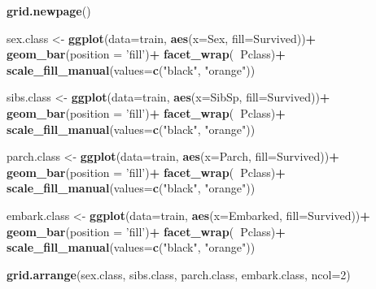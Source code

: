 \documentclass[
]{article}
\newenvironment{Shaded}{\begin{snugshade}}{\end{snugshade}}
\newcommand{\DataTypeTok}[1]{\textcolor[rgb]{0.13,0.29,0.53}{#1}}
\newcommand{\DecValTok}[1]{\textcolor[rgb]{0.00,0.00,0.81}{#1}}
\newcommand{\KeywordTok}[1]{\textcolor[rgb]{0.13,0.29,0.53}{\textbf{#1}}}
\newcommand{\NormalTok}[1]{#1}
\newcommand{\OperatorTok}[1]{\textcolor[rgb]{0.81,0.36,0.00}{\textbf{#1}}}
\newcommand{\StringTok}[1]{\textcolor[rgb]{0.31,0.60,0.02}{#1}}
\begin{document}
\begin{Shaded}
\begin{Highlighting}[]
\KeywordTok{grid.newpage}\NormalTok{()}

\NormalTok{sex.class <-}\StringTok{ }\KeywordTok{ggplot}\NormalTok{(}\DataTypeTok{data=}\NormalTok{train, }\KeywordTok{aes}\NormalTok{(}\DataTypeTok{x=}\NormalTok{Sex, }\DataTypeTok{fill=}\NormalTok{Survived))}\OperatorTok{+}
\StringTok{  }\KeywordTok{geom_bar}\NormalTok{(}\DataTypeTok{position =} \StringTok{'fill'}\NormalTok{)}\OperatorTok{+}
\StringTok{  }\KeywordTok{facet_wrap}\NormalTok{(}\OperatorTok{~}\NormalTok{Pclass)}\OperatorTok{+}
\StringTok{  }\KeywordTok{scale_fill_manual}\NormalTok{(}\DataTypeTok{values=}\KeywordTok{c}\NormalTok{(}\StringTok{"black"}\NormalTok{, }\StringTok{"orange"}\NormalTok{))}

\NormalTok{sibs.class <-}\StringTok{ }\KeywordTok{ggplot}\NormalTok{(}\DataTypeTok{data=}\NormalTok{train, }\KeywordTok{aes}\NormalTok{(}\DataTypeTok{x=}\NormalTok{SibSp, }\DataTypeTok{fill=}\NormalTok{Survived))}\OperatorTok{+}
\StringTok{  }\KeywordTok{geom_bar}\NormalTok{(}\DataTypeTok{position =} \StringTok{'fill'}\NormalTok{)}\OperatorTok{+}
\StringTok{  }\KeywordTok{facet_wrap}\NormalTok{(}\OperatorTok{~}\NormalTok{Pclass)}\OperatorTok{+}
\StringTok{  }\KeywordTok{scale_fill_manual}\NormalTok{(}\DataTypeTok{values=}\KeywordTok{c}\NormalTok{(}\StringTok{"black"}\NormalTok{, }\StringTok{"orange"}\NormalTok{))}


\NormalTok{parch.class <-}\StringTok{ }\KeywordTok{ggplot}\NormalTok{(}\DataTypeTok{data=}\NormalTok{train, }\KeywordTok{aes}\NormalTok{(}\DataTypeTok{x=}\NormalTok{Parch, }\DataTypeTok{fill=}\NormalTok{Survived))}\OperatorTok{+}
\StringTok{  }\KeywordTok{geom_bar}\NormalTok{(}\DataTypeTok{position =} \StringTok{'fill'}\NormalTok{)}\OperatorTok{+}
\StringTok{  }\KeywordTok{facet_wrap}\NormalTok{(}\OperatorTok{~}\NormalTok{Pclass)}\OperatorTok{+}
\StringTok{  }\KeywordTok{scale_fill_manual}\NormalTok{(}\DataTypeTok{values=}\KeywordTok{c}\NormalTok{(}\StringTok{"black"}\NormalTok{, }\StringTok{"orange"}\NormalTok{))}

\NormalTok{embark.class <-}\StringTok{ }\KeywordTok{ggplot}\NormalTok{(}\DataTypeTok{data=}\NormalTok{train, }\KeywordTok{aes}\NormalTok{(}\DataTypeTok{x=}\NormalTok{Embarked, }\DataTypeTok{fill=}\NormalTok{Survived))}\OperatorTok{+}
\StringTok{  }\KeywordTok{geom_bar}\NormalTok{(}\DataTypeTok{position =} \StringTok{'fill'}\NormalTok{)}\OperatorTok{+}
\StringTok{  }\KeywordTok{facet_wrap}\NormalTok{(}\OperatorTok{~}\NormalTok{Pclass)}\OperatorTok{+}
\StringTok{  }\KeywordTok{scale_fill_manual}\NormalTok{(}\DataTypeTok{values=}\KeywordTok{c}\NormalTok{(}\StringTok{"black"}\NormalTok{, }\StringTok{"orange"}\NormalTok{))}

\KeywordTok{grid.arrange}\NormalTok{(sex.class, sibs.class, parch.class, embark.class,  }\DataTypeTok{ncol=}\DecValTok{2}\NormalTok{)}
\end{Highlighting}
\end{Shaded}
\end{document}
